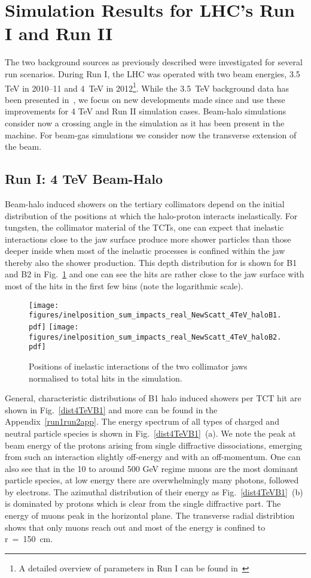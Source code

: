 \section{Simulation Results for LHC's Run I and Run II\label{run1run2}}

The two background sources as previously described were investigated for several run scenarios. During Run I, the LHC was operated with two beam energies, 3.5 TeV in 2010--11 and 4~TeV in 2012\footnote{A detailed overview of parameters in Run I can be found in~\cite{parametersRun1}}. While the 3.5~TeV background data has been presented in~\cite{nimPaperRod}, we focus on new developments made since and use these improvements for 4 TeV and Run II simulation cases. Beam-halo simulations consider now a crossing angle in the simulation as it has been present in the machine. For beam-gas simulations we consider now the transverse extension of the beam.

\subsection{Run I: 4 TeV Beam-Halo}

Beam-halo induced showers on the tertiary collimators depend on the initial distribution of the positions at which the halo-proton interacts inelastically. For tungsten, the collimator material of the TCTs, one can expect that inelastic interactions close to the jaw surface produce more shower particles than those deeper inside when most of the inelastic processes is confined within the jaw thereby also the shower production. This depth distribution for is shown for B1 and B2 in Fig.~\ref{inel4TeV} and one can see the hits are rather close to the jaw surface with most of the hits in the first few bins (note the logarithmic scale).

\begin{figure}%
\centering
\texttt{[image: figures/inelposition\_sum\_impacts\_real\_NewScatt\_4TeV\_haloB1.pdf]}
\texttt{[image: figures/inelposition\_sum\_impacts\_real\_NewScatt\_4TeV\_haloB2.pdf]}
 \caption{Positions of inelastic interactions of the two collimator jaws normalised to total hits in the simulation.
  \label{inel4TeV}}
\end{figure}

General, characteristic distributions of B1 halo induced showers per TCT hit are shown in Fig.~\ref{dist4TeVB1} and more can be found in the Appendix~\ref{run1run2app}. The energy spectrum of all types of charged and neutral particle species is shown in Fig.~\ref{dist4TeVB1}~(a). We note the peak at beam energy of the protons arising from single diffractive dissociations, emerging from such an interaction slightly off-energy and with an off-momentum. One can also see that in the 10 to around 500 GeV regime muons are the most dominant particle species, at low energy there are overwhelmingly many photons, followed by electrons. The azimuthal distribution of their energy as Fig.~\ref{dist4TeVB1}~(b) is dominated by protons which is clear from the single diffractive part. The energy of muons peak in the horizontal plane. The transverse radial distribtion shows that only muons reach out and most of the energy is confined to r~=~150~cm.  

